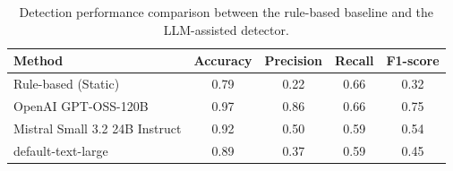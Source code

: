 \begin{table}[h]
\centering
\caption{Detection performance comparison between the rule-based baseline and the LLM-assisted detector.}
\label{tab:detection_performance}
\footnotesize
\begin{tabular}{lcccc}
\hline
\textbf{Method} & \textbf{Accuracy} & \textbf{Precision} & \textbf{Recall} & \textbf{F1-score} \\
\hline
Rule-based (Static) & 0.79 & 0.22 & 0.66 & 0.32 \\
OpenAI GPT-OSS-120B & 0.97 & 0.86 & 0.66 & 0.75 \\
Mistral Small 3.2 24B Instruct & 0.92 & 0.50 & 0.59 & 0.54 \\
default-text-large & 0.89 & 0.37 & 0.59 & 0.45 \\
\hline
\end{tabular}
\end{table}